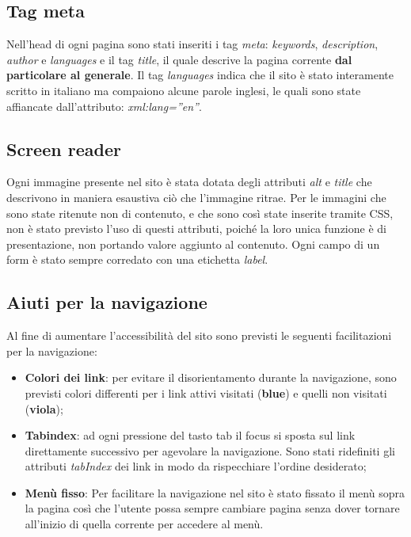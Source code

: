 	\subsection{Tag meta}
	Nell'head di ogni pagina sono stati inseriti  i tag \textit{meta}:  \textit{keywords}, \textit{description}, \textit{author} e \textit{languages} e il tag \textit{title}, il quale descrive la pagina corrente \textbf{dal particolare al generale}. Il tag \textit{languages} indica che il sito è stato interamente scritto in italiano ma compaiono alcune parole inglesi, le quali sono state affiancate dall’attributo: \textit{xml:lang=”en”}.
	
	\subsection{Screen reader}
	Ogni immagine presente nel sito è stata dotata degli attributi \textit{alt} e \textit{title} che descrivono in maniera esaustiva ciò che l'immagine ritrae. Per le immagini che sono state ritenute non di contenuto, e che sono così state inserite tramite CSS, non è stato previsto l'uso di questi attributi, poiché la loro unica funzione è di presentazione, non portando valore aggiunto al contenuto.
	Ogni campo di un form è stato sempre corredato con una etichetta \textit{label}.
	
	\subsection{Aiuti per la navigazione}
	Al fine di aumentare l'accessibilità del sito sono previsti le seguenti facilitazioni per la navigazione:
	\begin{itemize}
		\item \textbf{Colori dei link}: per evitare il disorientamento durante la navigazione, sono previsti colori differenti per i link attivi visitati (\textbf{blue}) e quelli non visitati (\textbf{viola});
		\item \textbf{Tabindex}: ad ogni pressione del tasto tab il focus si sposta sul link direttamente successivo per agevolare la navigazione. Sono stati ridefiniti gli attributi \textit{tabIndex} dei link in modo da rispecchiare l'ordine desiderato;
		\item \textbf{Menù fisso}: Per facilitare la navigazione nel sito è stato fissato il menù sopra la pagina così che l'utente possa sempre cambiare pagina senza dover tornare all'inizio di quella corrente per accedere al menù.
	\end{itemize}
	


